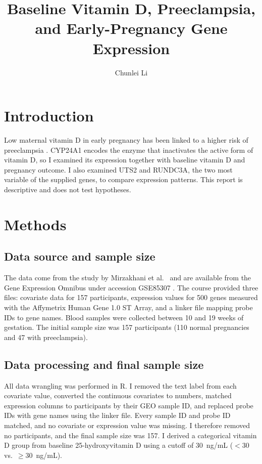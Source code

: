 \documentclass[11pt]{article}
\title{Baseline Vitamin D, Preeclampsia,\\
and Early-Pregnancy Gene Expression}
\author{Chunlei Li}
\date{}
\begin{document}
\maketitle

\section{Introduction}
Low maternal vitamin D in early pregnancy has been linked to a higher
risk of preeclampsia \cite{Mirzakhani2016}. CYP24A1 encodes the enzyme
that inactivates the active form of vitamin D, so I examined its
expression together with baseline vitamin D and pregnancy outcome. I also
examined UTS2 and RUNDC3A, the two most variable of the supplied genes,
to compare expression patterns. This report is descriptive and does not
test hypotheses.

\section{Methods}

\subsection{Data source and sample size}
The data come from the study by Mirzakhani et al.\ \cite{Mirzakhani2016}
and are available from the Gene Expression Omnibus under accession
GSE85307 \cite{GEO_GSE85307}. The course provided three files: covariate
data for 157 participants, expression values for 500 genes measured with
the Affymetrix Human Gene 1.0 ST Array, and a linker file mapping probe
IDs to gene names. Blood samples were collected between 10 and 19 weeks of
gestation. The initial sample size was 157 participants (110 normal
pregnancies and 47 with preeclampsia).

\subsection{Data processing and final sample size}
All data wrangling was performed in R. I removed the text label from each
covariate value, converted the continuous covariates to numbers, matched
expression columns to participants by their GEO sample ID, and replaced
probe IDs with gene names using the linker file. Every sample ID and probe
ID matched, and no covariate or expression value was missing. I therefore
removed no participants, and the final sample size was 157. I derived a
categorical vitamin D group from baseline 25-hydroxyvitamin D using a
cutoff of 30~ng/mL ($<$30 vs.\ $\geq$30~ng/mL).
\end{document}
